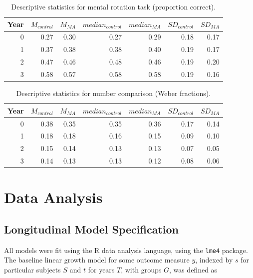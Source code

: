 \documentclass[11pt]{article}
\begin{document}
\begin{table}[H]
\centering
\begin{tabular}{rrrrrrr}
  \hline
Year & $M_{control}$ & $M_{MA}$ & $median_{control}$ & $median_{MA}$ & $SD_{control}$ & $SD_{MA}$ \\ 
  \hline
  0 & 0.27 & 0.30 & 0.27 & 0.29 & 0.18 & 0.17 \\ 
    1 & 0.37 & 0.38 & 0.38 & 0.40 & 0.19 & 0.17 \\ 
    2 & 0.47 & 0.46 & 0.48 & 0.46 & 0.19 & 0.20 \\ 
    3 & 0.58 & 0.57 & 0.58 & 0.58 & 0.19 & 0.16 \\ 
   \hline
\end{tabular}
\caption{Descriptive statistics for mental rotation task (proportion correct).} 
\label{tab:mental.rot}
\end{table}
\begin{table}[H]
\centering
\begin{tabular}{rrrrrrr}
  \hline
Year & $M_{control}$ & $M_{MA}$ & $median_{control}$ & $median_{MA}$ & $SD_{control}$ & $SD_{MA}$ \\ 
  \hline
  0 & 0.38 & 0.35 & 0.35 & 0.36 & 0.17 & 0.14 \\ 
    1 & 0.18 & 0.18 & 0.16 & 0.15 & 0.09 & 0.10 \\ 
    2 & 0.15 & 0.14 & 0.13 & 0.13 & 0.07 & 0.05 \\ 
    3 & 0.14 & 0.13 & 0.13 & 0.12 & 0.08 & 0.06 \\ 
   \hline
\end{tabular}
\caption{Descriptive statistics for number comparison (Weber fractions).} 
\label{tab:ans}
\end{table}


\section{Data Analysis}

\subsection{Longitudinal Model Specification}

All models were fit using the R data analysis language, using the \texttt{lme4} package. The baseline linear growth model for some outcome measure $y$, indexed by $s$ for particular subjects $S$ and $t$ for years $T$, with groups $G$, was defined as 
\end{document}
